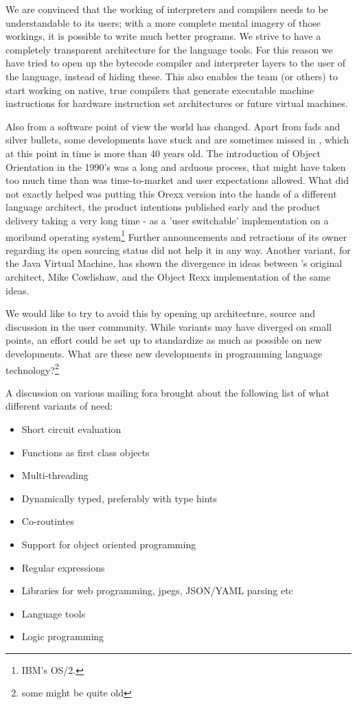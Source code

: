 We are convinced that the working of interpreters and compilers needs
to be understandable to its users; with a more complete mental imagery
of those workings, it is possible to write much better programs. We
strive to have a completely transparent architecture for the language
tools. For this reason we have tried to open up the bytecode compiler
and interpreter layers to the user of the language, instead of hiding
these. This also enables the team (or others) to start working on
native, true compilers that generate executable machine instructions
for hardware instruction set architectures or future virtual machines.

Also from a software point of view the world has changed. Apart from
fads and silver bullets, some developments have stuck and are
sometimes missed in \rexx{}, which at this point in time is more than
40 years old. The introduction of Object Orientation in the 1990's was
a long and arduous process, that might have taken too much time than
was time-to-market and user expectations allowed. What did not exactly
helped was putting this Orexx version into the hands of a different
language architect, the product intentions published early and the
product delivery taking a very long time - as a 'user switchable'
implementation on a moribund operating
system\footnote{IBM's OS/2.} Further announcements and retractions
of its owner regarding its open sourcing status did not help it in any way.
Another variant, for the Java Virtual Machine, has shown the
divergence in ideas between \rexx{}'s original architect, Mike
Cowlishaw, and the Object Rexx implementation of the same ideas.

We would like to try to avoid this by opening up architecture, source
and discussion in the user community. While \rexx{} variants may have
diverged on small points, an effort could be set up to standardize as
much as possible on new developments. What are these new developments
in programming language technology?\footnote{some might be quite old}

A discussion on various mailing fora brought about the following list
of what different variants of \rexx{} need:
\begin{itemize}
\item Short circuit evaluation
\item Functions as first class objects
\item Multi-threading
\item Dynamically typed, preferably with type hints
\item Co-routintes
\item Support for object oriented programming
\item Regular expressions
\item Libraries for web programming, jpegs, JSON/YAML parsing etc
\item Language tools
\item Logic programming
\end{itemize}


